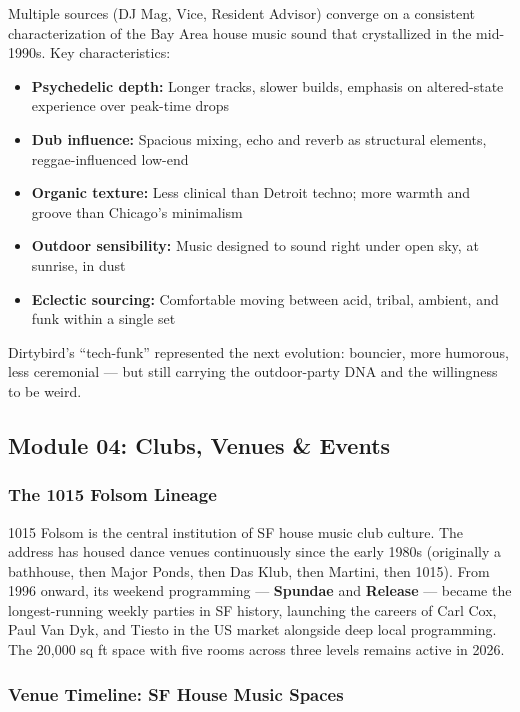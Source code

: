 \documentclass[11pt,letterpaper]{article}
\begin{document}
Multiple sources (DJ Mag, Vice, Resident Advisor) converge on a consistent characterization of the Bay Area house music sound that crystallized in the mid-1990s. Key characteristics:
\begin{itemize}[leftmargin=1.5em]
  \item \textbf{Psychedelic depth:} Longer tracks, slower builds, emphasis on altered-state experience over peak-time drops
  \item \textbf{Dub influence:} Spacious mixing, echo and reverb as structural elements, reggae-influenced low-end
  \item \textbf{Organic texture:} Less clinical than Detroit techno; more warmth and groove than Chicago's minimalism
  \item \textbf{Outdoor sensibility:} Music designed to sound right under open sky, at sunrise, in dust
  \item \textbf{Eclectic sourcing:} Comfortable moving between acid, tribal, ambient, and funk within a single set
\end{itemize}

Dirtybird's ``tech-funk'' represented the next evolution: bouncier, more humorous, less ceremonial --- but still carrying the outdoor-party DNA and the willingness to be weird.

\subsection{Module 04: Clubs, Venues \& Events}

\subsubsection{The 1015 Folsom Lineage}

1015 Folsom is the central institution of SF house music club culture. The address has housed dance venues continuously since the early 1980s (originally a bathhouse, then Major Ponds, then Das Klub, then Martini, then 1015). From 1996 onward, its weekend programming --- \textbf{Spundae} and \textbf{Release} --- became the longest-running weekly parties in SF history, launching the careers of Carl Cox, Paul Van Dyk, and Tiesto in the US market alongside deep local programming. The 20,000 sq ft space with five rooms across three levels remains active in 2026.

\subsubsection{Venue Timeline: SF House Music Spaces}
\end{document}
